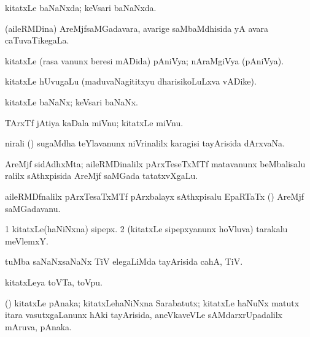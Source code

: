 \bentry
{}
\gl{\gu}
\bmng
kitatxLe baNaNxda; keVsari baNaNxda. 
\emng
\eentry

\bentry
{}
\gl{\gu}
\bmng
(aileRMDina) AreMjfsaMGadavara, avarige saMbaMdhisida yA avara caTuvaTikegaLa. 
\emng
\eentry

\bentry
{}
\gl{\nA}
\bmng
kitatxLe (rasa \mo vanunx beresi mADida) pAniVya; nAraMgiVya (pAniVya). 
\emng
\eentry

\bentry
{}
\gl{\nA}
\bmng
kitatxLe hUvugaLu (maduvaNagititxyu dharisikoLuLxva vADike). 
\emng
\eentry

\bentry
{}
\gl{\nA}
\bmng
kitatxLe baNaNx; keVsari baNaNx. 
\emng
\eentry

\bentry
{}
\gl{\nA}
\bmng
TArxTf jAtiya kaDala miVnu; kitatxLe miVnu. 
\emng
\eentry

\bentry
{}
\gl{\nA}
\bmng
nirali () sugaMdha teYlavanunx niVrinalilx karagisi tayArisida dArxvaNa. 
\emng
\eentry

\bentry
{}
\gl{\nA}
\bmng
AreMjf sidAdhxMta; aileRMDinalilx pArxTeseTxMTf matavanunx beMbalisalu ralilx sAthxpisida AreMjf saMGada tatatxvXgaLu. 
\emng
\eentry

\bentry
{}
\gl{\nA}
\bmng
aileRMDfnalilx pArxTesaTxMTf pArxbalayx sAthxpisalu EpaRTaTx () AreMjf saMGadavanu. 
\emng
\eentry

\bentry
{}
\gl{\nA}
\bmng
\bnum
\num{1} kitatxLe(haNiNxna) sipepx. 
\num{2} (kitatxLe sipepxyanunx hoVluva) tarakalu meVlemxY. 
\enum
\emng
\eentry

\bentry
{}
\gl{\nA}
\bmng
tuMba saNaNxsaNaNx TiV elegaLiMda tayArisida cahA, TiV. 
\emng
\eentry

\bentry
{}
\gl{\nA}
\bmng
kitatxLeya toVTa, toVpu. 
\emng
\eentry

\bentry
{}
\gl{\nA}
\bmng
(\birx) kitatxLe pAnaka; kitatxLehaNiNxna Sarabatutx; kitatxLe haNuNx matutx itara vasutxgaLanunx hAki tayArisida, aneVkaveVLe sAMdarxrUpadalilx mAruva, pAnaka. 
\emng
\eentry

